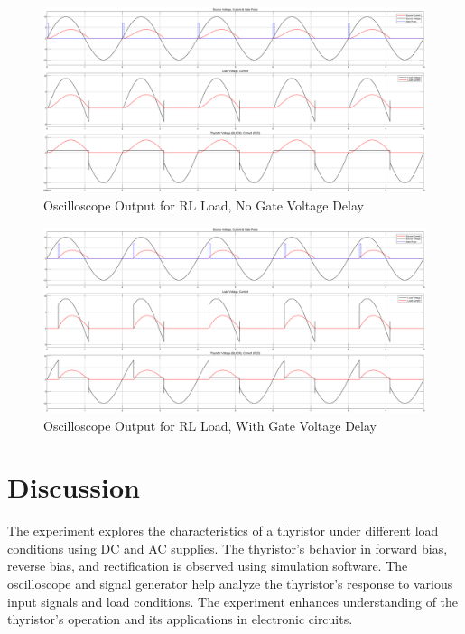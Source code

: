 \documentclass[12pt]{article}
\begin{document}
\begin{figure}[H]
    \centering
    \includegraphics[width=\textwidth]{rl.png}
    \caption{Oscilloscope Output for RL Load, No Gate Voltage Delay}
    \label{fig:rlLoad}
\end{figure}

\begin{figure}[H]
    \centering
    \includegraphics[width=\textwidth]{rl_delay.png}
    \caption{Oscilloscope Output for RL Load, With Gate Voltage Delay}
    \label{fig:rlLoadDelay}
\end{figure}

\section*{Discussion}
The experiment explores the characteristics of a thyristor under different load conditions using DC and AC supplies. The thyristor's behavior in forward bias, reverse bias, and rectification is observed using simulation software. The oscilloscope and signal generator help analyze the thyristor's response to various input signals and load conditions. The experiment enhances understanding of the thyristor's operation and its applications in electronic circuits.
\end{document}
